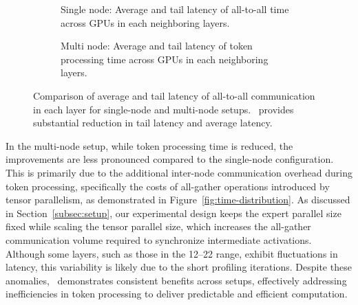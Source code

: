 \begin{figure}
    \centering
    \begin{subfigure}[b]{\linewidth}
        \centering
        \vspace{-1.8em}
        \caption{Single node: Average and tail latency of all-to-all time across GPUs in each neighboring layers.}
        \vspace{0.5em}
        \label{fig:tail-latency-communication-1node}
    \end{subfigure}
    \begin{subfigure}[b]{\linewidth}
        \centering
        \vspace{-1.8em}
        \caption{Multi node: Average and tail latency of token processing time across GPUs in each neighboring layers.}
        \label{fig:tail-latency-communication-2nodes}
    \end{subfigure}
    \vspace{-2em}
    \caption{Comparison of average and tail latency of all-to-all communication in each layer for single-node and multi-node setups. \expertune~provides substantial reduction in tail latency and average latency.}
    \label{fig:communication-tail-latency-comparison}
\end{figure}

In the multi-node setup, while token processing time is reduced, the improvements are less pronounced compared to the single-node configuration. 
%
This is primarily due to the additional inter-node communication overhead during token processing, specifically the costs of all-gather operations introduced by tensor parallelism, as demonstrated in Figure~\ref{fig:time-distribution}.
%
As discussed in Section~\ref{subsec:setup}, our experimental design keeps the expert parallel size fixed while scaling the tensor parallel size, which increases the all-gather communication volume required to synchronize intermediate activations.
%
Although some layers, such as those in the 12–22 range, exhibit fluctuations in latency, this variability is likely due to the short profiling iterations.
%
Despite these anomalies, \expertune~demonstrates consistent benefits across setups, effectively addressing inefficiencies in token processing to deliver predictable and efficient computation.


